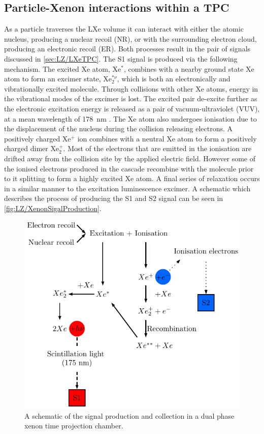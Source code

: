 \subsection{Particle-Xenon interactions within a TPC}\label{sec:LZ/XeInteractionsTPC}
As a particle traverses the LXe volume it can interact with either the atomic nucleus, producing a nuclear recoil (NR), or with the surrounding electron cloud, producing an electronic recoil (ER). Both processes result in the pair of signals discussed in \autoref{sec:LZ/LXeTPC}. The S1 signal is produced via the following mechanism. The excited Xe atom, Xe$^{*}$, combines with a nearby ground state Xe atom to form an excimer state, Xe$_{2}^{*\nu}$, which is both an electronically and vibrationally excited molecule. Through collisions with other Xe atoms, energy in the vibrational modes of the excimer is lost. The excited pair de-excite further as the electronic excitation energy is released as a pair of vacuum-ultraviolet (VUV), at a mean wavelength of 178~nm \cite{Schumann:2014uva}.
The Xe atom also undergoes ionisation due to the displacement of the nucleus during the collision releasing electrons. A positively charged Xe$^{+}$ ion combines with a neutral Xe atom to form a positively charged dimer Xe$^{+}_{2}$. Most of the electrons that are emitted in the ionisation are drifted away from the collision site by the applied electric field. However some of the ionised electrons produced in the cascade recombine with the molecule prior to it splitting to form a highly excited Xe atom. A final series of relaxation occurs in a similar manner to the excitation luminescence excimer. A schematic which describes the process of producing the S1 and S2 signal can be seen in \autoref{fig:LZ/XenonSigalProduction}.
\begin{figure}[!ht]
    \centering
    \includegraphics[width=0.8\linewidth]{figures/LZ/Xenon_interaction.pdf}
    \caption{A schematic of the signal production and collection in a dual phase xenon time projection chamber.}
    \label{fig:LZ/XenonSigalProduction}
\end{figure}
